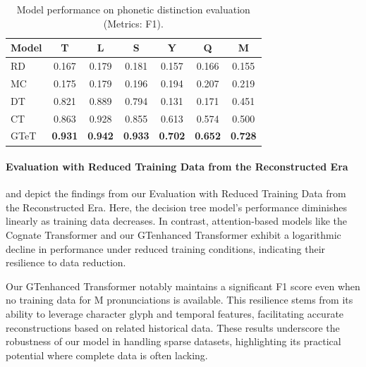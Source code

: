 \begin{table}[ht]
    \centering
    \footnotesize
    \begin{tabular}{l@{\hskip 10pt}c@{\hskip 10pt}c@{\hskip 10pt}c@{\hskip 10pt}c@{\hskip 10pt}c@{\hskip 10pt}c}
    \hline
    \textbf{Model} & \textbf{T} & \textbf{L} & \textbf{S} & \textbf{Y} & \textbf{Q} & \textbf{M}\\
    \hline
    RD & 0.167 & 0.179 & 0.181 & 0.157 & 0.166 & 0.155\\
    MC & 0.175 & 0.179 & 0.196 & 0.194 & 0.207 & 0.219\\
    \hline
    DT & 0.821 & 0.889 & 0.794 & 0.131 & 0.171 & 0.451\\
    CT & 0.863 & 0.928 & 0.855 & 0.613 & 0.574 & 0.500\\
    GTeT & \textbf{0.931} & \textbf{0.942} & \textbf{0.933} & \textbf{0.702} & \textbf{0.652} & \textbf{0.728}\\
    \hline
    \end{tabular}
    \caption{Model performance on phonetic distinction evaluation (Metrics: F1).}
    \label{tab:strict split}
\end{table}

\paragraph{Evaluation with Reduced Training Data from the Reconstructed Era}

 and  depict the findings from our Evaluation with Reduced Training Data from the Reconstructed Era. Here, the decision tree model's performance diminishes linearly as training data decreases. In contrast, attention-based models like the Cognate Transformer and our GTenhanced Transformer exhibit a logarithmic decline in performance under reduced training conditions, indicating their resilience to data reduction.

Our GTenhanced Transformer notably maintains a significant F1 score even when no training data for M pronunciations is available. This resilience stems from its ability to leverage character glyph and temporal features, facilitating accurate reconstructions based on related historical data. These results underscore the robustness of our model in handling sparse datasets, highlighting its practical potential where complete data is often lacking.

